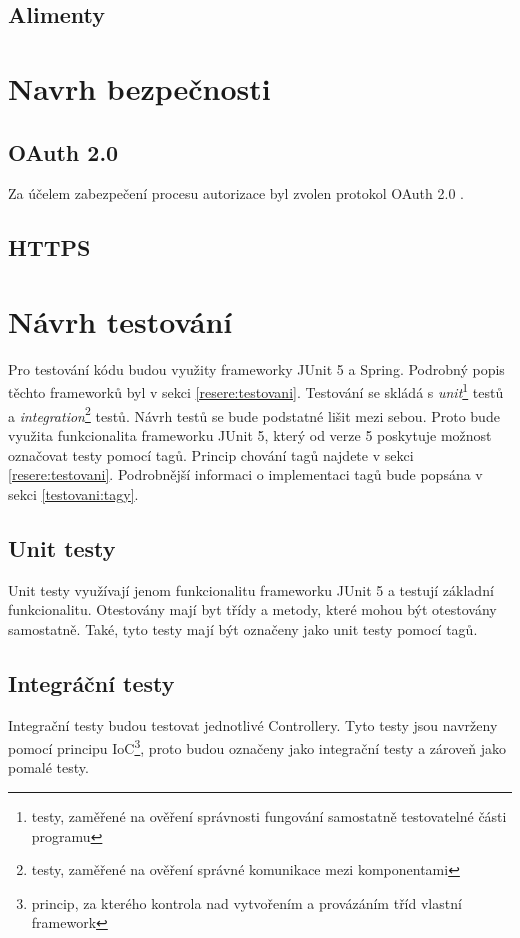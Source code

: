     \subsection{Alimenty}\label{navrh:upravy:alimenty}
\section{Navrh bezpečnosti}\label{navrh:bezpecnost}
    \subsection{OAuth 2.0}
        Za účelem zabezpečení procesu autorizace byl zvolen protokol OAuth 2.0 . 
    \subsection{HTTPS}
\section{Návrh testování}\label{navrh:testovani}
    Pro testování kódu budou využity frameworky JUnit 5 a Spring. Podrobný popis těchto frameworků byl v sekci \ref{resere:testovani}. Testování se skládá s \textit{unit}\footnote{testy, zaměřené na ověření správnosti fungování samostatně testovatelné části programu} testů a \textit{integration}\footnote{testy, zaměřené na ověření správné komunikace mezi komponentami} testů. Návrh testů se bude podstatné lišit mezi sebou. Proto bude využita funkcionalita frameworku JUnit 5, který od verze 5 poskytuje možnost označovat testy pomocí tagů. Princip chování tagů najdete v sekci \ref{resere:testovani}. Podrobnější informaci o implementaci tagů bude popsána v sekci \ref{testovani:tagy}.
    \subsection{Unit testy}
        Unit testy využívají jenom funkcionalitu frameworku JUnit 5 a testují základní funkcionalitu. Otestovány mají byt třídy a metody, které mohou být otestovány samostatně. Také, tyto testy mají být označeny jako unit testy pomocí tagů.  %
    \subsection{Integráční testy}
        Integrační testy budou testovat jednotlivé Controllery. Tyto testy jsou navrženy pomocí principu IoC\footnote{princip, za kterého kontrola nad vytvořením a provázáním tříd vlastní framework}, proto budou označeny jako integrační testy a zároveň jako pomalé testy.